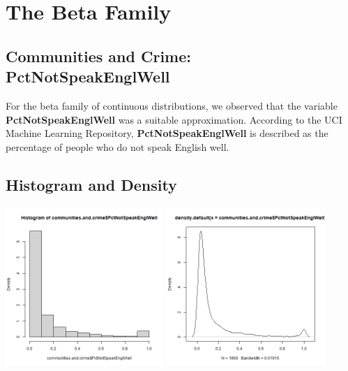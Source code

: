 \documentclass[12pt, letterpaper]{report}
\begin{document}
\maketitle
\chapter{The Beta Family}
\section{Communities and Crime: PctNotSpeakEnglWell}

For the beta family of continuous distributions, we observed that the variable \textbf{PctNotSpeakEnglWell} was a suitable approximation. 
According to the UCI Machine Learning Repository, \textbf{PctNotSpeakEnglWell} is described as the percentage of people who do not speak English well. 


\section{Histogram and Density}



\begin{center}
\includegraphics[width=0.45\textwidth]{beta/PctNotSpeakEnglWell_hist}
\includegraphics[width=0.45\textwidth]{beta/PctNotSpeakEnglWell_density}
\end{center}
\end{document}
